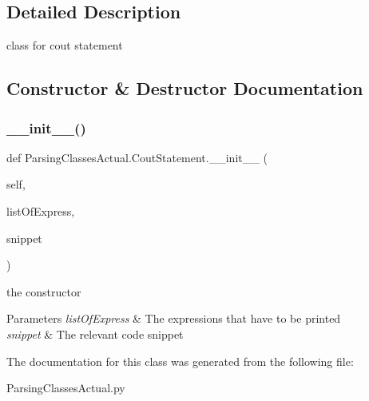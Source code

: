 \subsection{Detailed Description}
class for cout statement 

\subsection{Constructor \& Destructor Documentation}
\mbox{\label{class_parsing_classes_actual_1_1_cout_statement_a0e4930ecbd6e69aac9830659965c4c9c}} 
\subsubsection{\texorpdfstring{\+\_\+\+\_\+init\+\_\+\+\_\+()}{\_\_init\_\_()}}
{\footnotesize\ttfamily def Parsing\+Classes\+Actual.\+Cout\+Statement.\+\_\+\+\_\+init\+\_\+\+\_\+ (\begin{DoxyParamCaption}\item[{}]{self,  }\item[{}]{list\+Of\+Express,  }\item[{}]{snippet }\end{DoxyParamCaption})}



the constructor 


\begin{DoxyParams}{Parameters}
{\em list\+Of\+Express} & The expressions that have to be printed \\
\hline
{\em snippet} & The relevant code snippet \\
\hline
\end{DoxyParams}


The documentation for this class was generated from the following file\+:\begin{DoxyCompactItemize}
\item 
Parsing\+Classes\+Actual.\+py\end{DoxyCompactItemize}
